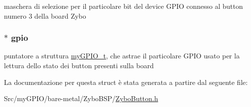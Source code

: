 maschera di selezione per il particolare bit del device G\+P\+I\+O connesso al button numero 3 della board Zybo \hypertarget{struct_zybo_button__t_ac37ddc7c58d246d233dfb38037020184}{
\subsubsection[{gpio}]{$\ast$ gpio}}\label{struct_zybo_button__t_ac37ddc7c58d246d233dfb38037020184}
puntatore a struttura \hyperlink{structmy_g_p_i_o__t}{my\+G\+P\+I\+O\+\_\+t}, che astrae il particolare G\+P\+I\+O usato per la lettura dello stato dei button presenti sulla board 

La documentazione per questa struct è stata generata a partire dal seguente file\+:\begin{DoxyCompactItemize}
\item 
Src/my\+G\+P\+I\+O/bare-\/metal/\+Zybo\+B\+S\+P/\hyperlink{_zybo_button_8h}{Zybo\+Button.\+h}\end{DoxyCompactItemize}
